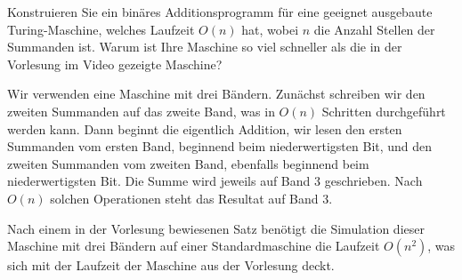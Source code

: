 Konstruieren Sie ein binäres Additionsprogramm für eine geeignet
ausgebaute Turing-Maschine, welches Laufzeit
$O(n)$ hat, wobei $n$ die Anzahl Stellen der Summanden ist.
Warum ist Ihre Maschine so viel schneller als die in der Vorlesung
im Video gezeigte Maschine?


\begin{loesung}
Wir verwenden eine Maschine mit drei Bändern. Zunächst schreiben
wir den zweiten Summanden auf das zweite Band, was in $O(n)$
Schritten durchgeführt werden kann.
Dann beginnt die
eigentlich Addition, wir lesen den ersten Summanden vom ersten Band,
beginnend beim niederwertigsten Bit, und den zweiten Summanden
vom zweiten Band, ebenfalls beginnend beim niederwertigsten Bit.
Die Summe wird jeweils auf Band 3 geschrieben. Nach $O(n)$
solchen Operationen steht das Resultat auf Band 3.

Nach einem in der Vorlesung bewiesenen Satz benötigt
die Simulation dieser Maschine mit drei Bändern auf einer Standardmaschine
die Laufzeit $O(n^2)$, was sich mit der Laufzeit der Maschine
aus der Vorlesung deckt.
\end{loesung}


